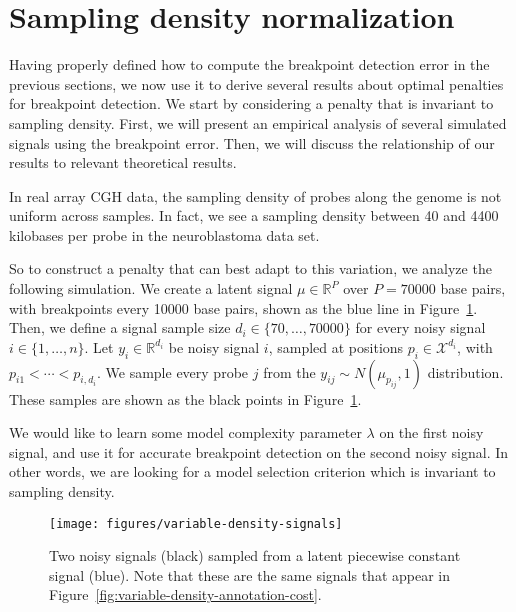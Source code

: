 \documentclass{jsfds} %
\newcommand{\RR}{\mathbb{R}}
\begin{document}
\newpage

\section{Sampling density normalization}
\label{variable_density}
Having properly defined how to compute the breakpoint detection error
in the previous sections, we now use it to derive several results
about optimal penalties for breakpoint detection. We start by
considering a penalty that is invariant to sampling density. First, we
will present an empirical analysis of several simulated signals using
the breakpoint error. Then, we will discuss the relationship of our
results to relevant theoretical results.

In real array CGH data, the sampling density of probes along the
genome is not uniform across samples. In fact, we see a sampling
density between 40 and 4400 kilobases per probe in the neuroblastoma
data set.

So to construct a penalty that can best adapt to this variation, we
analyze the following simulation. We create a latent signal
$\mu\in\RR^P$ over $P=70000$ base pairs, with breakpoints every 10000
base pairs, shown as the blue line in
Figure~\ref{fig:variable-density-signals}. Then, we define a signal
sample size $d_i\in\{70,\dots,70000\}$ for every noisy signal
$i\in\{1,\dots,n\}$. Let $y_i\in\RR^{d_i}$ be noisy signal $i$,
sampled at positions $p_i\in\mathcal X^{d_i}$, with
$p_{i1}<\cdots<p_{i,d_i}$. We sample every probe $j$ from the
$y_{ij}\sim N(\mu_{p_{ij}},1)$ distribution. These samples are shown
as the black points in Figure~\ref{fig:variable-density-signals}.

We would like to learn some model complexity parameter $\lambda$ on
the first noisy signal, and use it for accurate breakpoint detection
on the second noisy signal. In other words, we are looking for a model
selection criterion which is invariant to sampling density. 

\begin{figure}[H]
\texttt{[image: figures/variable-density-signals]}
%
\vskip -0.3cm
  \caption{Two noisy signals (black) sampled from
  a latent piecewise constant signal (blue). Note that these are the
  same signals that appear in
  Figure~\ref{fig:variable-density-annotation-cost}.}
\label{fig:variable-density-signals}
\end{figure}

\newpage
\end{document}

